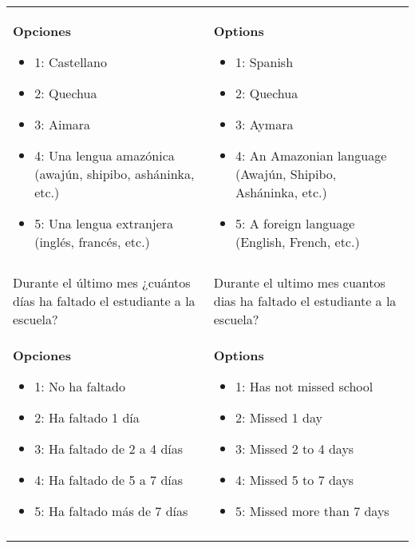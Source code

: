 \documentclass[11pt]{article}
\begin{document}
\begin{longtable}{@{}LL@{}}
\textbf{Opciones}\par\begin{itemize}[leftmargin=*]\item 1: Castellano
\item 2: Quechua
\item 3: Aimara
\item 4: Una lengua amazónica (awajún, shipibo, asháninka, etc.)
\item 5: Una lengua extranjera (inglés, francés, etc.)\end{itemize} & \textbf{Options}\par\begin{itemize}[leftmargin=*]\item 1: Spanish
\item 2: Quechua
\item 3: Aymara
\item 4: An Amazonian language (Awajún, Shipibo, Asháninka, etc.)
\item 5: A foreign language (English, French, etc.)\end{itemize} \\
\addlinespace[4pt]
 \\ 
Durante el último mes ¿cuántos días ha faltado el estudiante a la escuela? & Durante el ultimo mes cuantos dias ha faltado el estudiante a la escuela? \\
\textbf{Opciones}\par\begin{itemize}[leftmargin=*]\item 1: No ha faltado
\item 2: Ha faltado 1 día
\item 3: Ha faltado de 2 a 4 días
\item 4: Ha faltado de 5 a 7 días
\item 5: Ha faltado más de 7 días\end{itemize} & \textbf{Options}\par\begin{itemize}[leftmargin=*]\item 1: Has not missed school
\item 2: Missed 1 day
\item 3: Missed 2 to 4 days
\item 4: Missed 5 to 7 days
\item 5: Missed more than 7 days\end{itemize} \\
\addlinespace[4pt]
 \\ 

\end{longtable}
\end{document}
